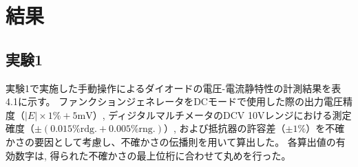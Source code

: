 \section{結果}
\subsection{実験1}



実験1で実施した手動操作によるダイオードの電圧-電流静特性の計測結果を表4.1に示す。
ファンクションジェネレータをDCモードで使用した際の出力電圧精度（$|E| \times 1\% + 5\text{mV}$）,
ディジタルマルチメータのDCV 10Vレンジにおける測定確度（$\pm(0.015\% \text{rdg.} + 0.005\% \text{rng.})$）,
および抵抗器の許容差（$\pm 1\%$）を不確かさの要因として考慮し、不確かさの伝播則を用いて算出した。
各算出値の有効数字は,
得られた不確かさの最上位桁に合わせて丸めを行った。
\newpage
